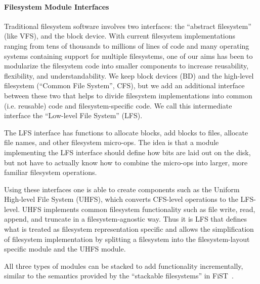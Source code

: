 \paragraph{Filesystem Module Interfaces}
\label{sec:interfaces}

Traditional filesystem software involves two interfaces: the ``abstract
filesystem'' (like VFS), and the block device. With current filesystem
implementations ranging from tens of thousands to millions of lines of code and
many operating systems containing support for multiple filesystems, one of our
aims has been to modularize the filesystem code into smaller components to
increase reusability, flexibility, and understandability. We keep block devices
(BD) and the high-level filesystem (``Common File System'', CFS), but we add an
additional interface between these two that helps to divide filesystem
implementations into common (i.e. reusable) code and filesystem-specific code.
We call this intermediate interface the ``Low-level File System'' (LFS).

The LFS interface has functions to allocate blocks, add blocks to files,
allocate file names, and other filesystem micro-ops. The idea is that a module
implementing the LFS interface should define how bits are laid out on the disk,
but not have to actually know how to combine the micro-ops into larger, more
familiar filesystem operations.

Using these interfaces one is able to create components such as the Uniform
High-level File System (UHFS), which converts CFS-level operations to the
LFS-level. UHFS implements common filesystem functionality such as file write,
read, append, and truncate in a filesystem-agnostic way. Thus it is LFS that
defines what is treated as filesystem representation specific and allows the
simplification of filesystem implementation by splitting a filesystem into the
filesystem-layout specific module and the UHFS module.

All three types of modules can be stacked to add functionality incrementally,
similar to the semantics provided by the ``stackable filesystems'' in
FiST~\cite{zadok00fist}.
